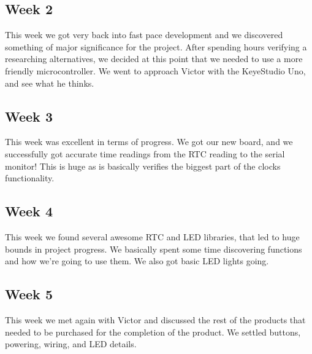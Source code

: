 \documentclass[onecolumn, draftclsnofoot,10pt, compsoc]{IEEEtran}
\begin{document}
\subsection{Week 2}
This week we got very back into fast pace development and we discovered something of major significance for the project.
After spending hours verifying a researching alternatives, we decided at this point that we needed to use a more friendly microcontroller.
We went to approach Victor with the KeyeStudio Uno, and see what he thinks.

\subsection{Week 3}
This week was excellent in terms of progress.
We got our new board, and we successfully got accurate time readings from the RTC reading to the serial monitor!
This is huge as is basically verifies the biggest part of the clocks functionality.

\subsection{Week 4}
This week we found several awesome RTC and LED libraries, that led to huge bounds in project progress.
We basically spent some time discovering functions and how we're going to use them.
We also got basic LED lights going.

\subsection{Week 5}
This week we met again with Victor and discussed the rest of the products that needed to be purchased for the completion of the product.
We settled buttons, powering, wiring, and LED details.

\newpage
\end{document}
